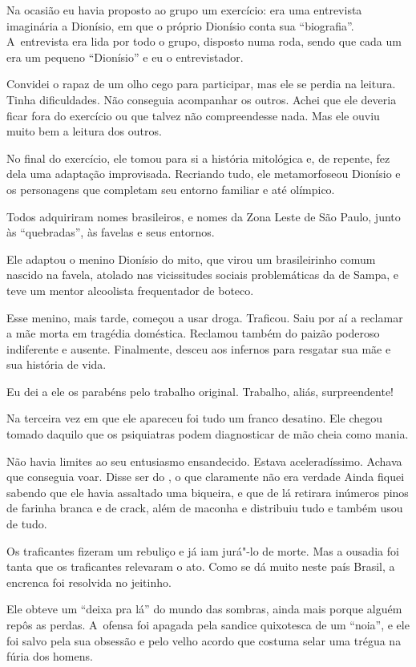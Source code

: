 Na ocasião eu havia proposto ao grupo um exercício: era uma entrevista
imaginária a Dionísio, em que o próprio Dionísio conta sua
``biografia''. A~entrevista era lida por todo o grupo, disposto numa
roda, sendo que cada um era um pequeno ``Dionísio'' e eu o
entrevistador.

Convidei o rapaz de um olho cego para participar, mas ele se perdia na
leitura. Tinha dificuldades. Não conseguia acompanhar os outros. Achei
que ele deveria ficar fora do exercício ou que talvez não compreendesse
nada. Mas ele ouviu muito bem a leitura dos outros.

No final do exercício, ele tomou para si a história mitológica e, de
repente, fez dela uma adaptação improvisada. Recriando tudo, ele
metamorfoseou Dionísio e os personagens que completam seu entorno
familiar e até olímpico.

Todos adquiriram nomes brasileiros, e nomes da Zona Leste de São Paulo,
junto às ``quebradas'', às favelas e seus entornos.

Ele adaptou o menino Dionísio do mito, que virou um brasileirinho comum
nascido na favela, atolado nas vicissitudes sociais problemáticas da  de Sampa, 
e teve um mentor alcoolista frequentador de boteco.

Esse menino, mais tarde, começou a usar droga. Traficou. Saiu por aí a
reclamar a mãe morta em tragédia doméstica. Reclamou também do paizão
poderoso indiferente e ausente. Finalmente, desceu aos infernos para
resgatar sua mãe e sua história de vida.

Eu dei a ele os parabéns pelo trabalho original. Trabalho, aliás,
surpreendente!

\asterisc{}

Na terceira vez em que ele apareceu foi tudo um franco desatino. Ele
chegou tomado daquilo que os psiquiatras podem diagnosticar de mão cheia
como mania.

Não havia limites ao seu entusiasmo ensandecido. Estava aceleradíssimo.
Achava que conseguia voar. Disse ser do , o que claramente não era verdade
Ainda fiquei sabendo que ele havia assaltado uma biqueira, e
que de lá retirara inúmeros pinos de farinha branca e de crack, além de
maconha e distribuiu tudo e também usou de tudo.

Os traficantes fizeram um rebuliço e já iam jurá"-lo de morte. Mas a
ousadia foi tanta que os traficantes relevaram o ato. Como se dá muito
neste país Brasil, a encrenca foi resolvida no jeitinho.

Ele obteve um ``deixa pra lá'' do mundo das sombras, ainda mais porque
alguém repôs as perdas. A~ofensa foi apagada pela sandice quixotesca de
um ``noia'', e ele foi salvo pela sua obsessão e pelo velho acordo que
costuma selar uma trégua na fúria dos homens.

